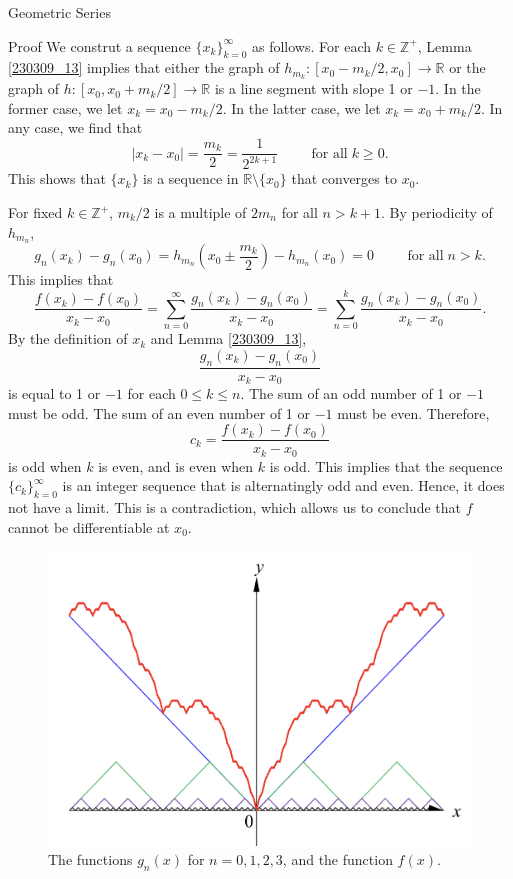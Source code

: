 \begin{example}[label=230305_16]{Geometric Series}
\begin{example}[label=230304_9]{}
\begin{example}{}
\begin{example}{}
\begin{myproof}{Proof}
We construt a sequence $\{x_{k}\}_{k=0}^{\infty}$ as follows.  For each $k\in \mathbb{Z}^+$, Lemma \ref{230309_13} implies that either the graph of $
h_{m_k}:[x_0-m_k/2, x_0]\to\mathbb{R}$ or the graph of $h:[x_0, x_0+m_k/2]\to\mathbb{R}$ is a line segment with slope 1 or $-1$.   In the former case, we let $x_{k}=x_0-m_k/2$. In the latter case, we let $x_{k}=x_0+m_k/2$. In any case, we find that
\[|x_{k}-x_0|=\frac{m_k}{2}=\frac{1}{2^{2k+1}}\hspace{1cm}\text{for all}\;k\geq 0.\]
This shows that $\{x_{k}\}$ is a sequence in $\mathbb{R}\setminus\{x_0\}$ that converges to $x_0$. 

For fixed $k\in \mathbb{Z}^+$, 
$m_k/2$ is a multiple of $2m_n$ for all $n>k+1$. By periodicity of $h_{m_n}$, 
\[g_n(x_{k})-g_n(x_0)=h_{m_n}\left(x_0\pm \frac{m_k}{2}\right)-h_{m_n}(x_0)=0\hspace{1cm} \text{for all}\;n>k.\]
This implies that
\[ \frac{f(x_k)-f(x_0)}{x_k-x_0}=\sum_{n=0}^{\infty}\frac{g_n(x_k)-g_n(x_0)}{x_k-x_0}=\sum_{n=0}^{k}\frac{g_n(x_k)-g_n(x_0)}{x_k-x_0}.\]
By the  definition of $x_k$ and Lemma \ref{230309_13}, 
\[\frac{g_n(x_k)-g_n(x_0)}{x_k-x_0}\] is equal to 1 or $-1$ for each $0\leq k\leq n$. The sum of an odd number of 1 or $-1$ must be odd. The sum of an even number of 1 or $-1$ must be even.
Therefore,
\[c_k=\frac{f(x_k)-f(x_0)}{x_k-x_0}\] is odd when $k$ is even, and is even when $k$ is odd. 
This implies that the sequence $\{c_k\}_{k=0}^{\infty}$ is an integer sequence that is alternatingly odd and even. Hence, it does not have a limit. This is a contradiction, which allows us to  conclude that $f$ cannot be differentiable at $x_0$. 
 

\end{myproof}

\begin{figure}[ht]
\centering
\includegraphics[scale=0.18]{Picture64.png}
\caption{The functions $g_n(x)$ for $n=0, 1, 2, 3$, and the function $f(x)$.\fa}\label{figure64}
\end{figure}
 

\end{example}
\end{example}
\end{example}
\end{example}
